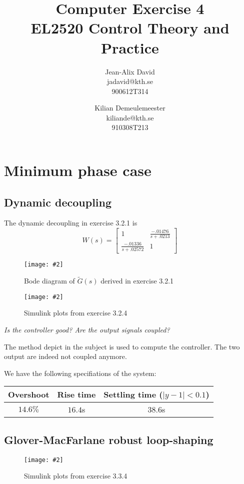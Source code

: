 \documentclass[a4paper,11pt]{article}
\title{
	Computer Exercise 4\\
	EL2520 Control Theory and Practice
}
\author{
	Jean-Alix David\\
	jadavid@kth.se\\
	900612T314
	\and
	Kilian Demeulemeester\\
	kiliande@kth.se\\
	910308T213
}
\newcommand{\image}[3][width=.8\columnwidth]{
	\begin{figure}[h!]
		\centering
	    \texttt{[image: \#2]}
		\caption{#3}
		\label{fig:#2}
	\end{figure}
}
\begin{document}
	\maketitle

	\section*{Minimum phase case}

	\subsection*{Dynamic decoupling}
	The dynamic decoupling in exercise 3.2.1 is
	\[
        W(s) = \left[\begin{array}{cc} 
            1 & \frac{-.01476}{s + .0213} \\
    \frac{-.01336}{s + .02572} & 1 \end{array} \right]
	\]

	\image{fig/figure_1.eps}{Bode diagram of $\tilde{G}(s)$ derived in exercise 3.2.1}
	\image{fig/figure_2.eps}{Simulink plots from exercise 3.2.4}

    \emph{Is the controller good? Are the output signals coupled?}
    
    The method depict in the subject is used to compute the controller. The two output are indeed not coupled anymore. 
    
    We have the following specifiations of the system:
    \begin{center}
    \begin{tabular}{|c|c|c|}
        \hline
        Overshoot & Rise time & Settling time ($|y - 1| < 0.1$)\\
        \hline
        $14.6\%$ & $16.4$s & $38.6$s \\
        \hline
    \end{tabular}
    \end{center}
    
	\subsection*{Glover-MacFarlane robust loop-shaping}

	\image{fig/figure_3.eps}{Simulink plots from exercise 3.3.4}
\end{document}
